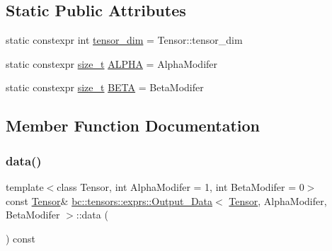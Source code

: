 \subsection*{Static Public Attributes}
\begin{DoxyCompactItemize}
\item 
static constexpr int \hyperlink{structbc_1_1tensors_1_1exprs_1_1Output__Data_a94a1df11454a60c39b2cefd6e22f4077}{tensor\+\_\+dim} = Tensor\+::tensor\+\_\+dim
\item 
static constexpr \hyperlink{namespacebc_aaf8e3fbf99b04b1b57c4f80c6f55d3c5}{size\+\_\+t} \hyperlink{structbc_1_1tensors_1_1exprs_1_1Output__Data_a8180bfc8cd47bd07e617da232baca625}{A\+L\+P\+HA} = Alpha\+Modifer
\item 
static constexpr \hyperlink{namespacebc_aaf8e3fbf99b04b1b57c4f80c6f55d3c5}{size\+\_\+t} \hyperlink{structbc_1_1tensors_1_1exprs_1_1Output__Data_a0de394d92d40090e01a31039ae473791}{B\+E\+TA} = Beta\+Modifer
\end{DoxyCompactItemize}


\subsection{Member Function Documentation}
\mbox{\label{structbc_1_1tensors_1_1exprs_1_1Output__Data_a78e4c65ec0092212f48fefa843f3e9bf}} 
\subsubsection{\texorpdfstring{data()}{data()}\hspace{0.1cm}{\footnotesize\ttfamily [1/2]}}
{\footnotesize\ttfamily template$<$class Tensor, int Alpha\+Modifer = 1, int Beta\+Modifer = 0$>$ \\
const \hyperlink{namespacebc_a659391e47ab612be3ba6c18cf9c89159}{Tensor}\& \hyperlink{structbc_1_1tensors_1_1exprs_1_1Output__Data}{bc\+::tensors\+::exprs\+::\+Output\+\_\+\+Data}$<$ \hyperlink{namespacebc_a659391e47ab612be3ba6c18cf9c89159}{Tensor}, Alpha\+Modifer, Beta\+Modifer $>$\+::data (\begin{DoxyParamCaption}{ }\end{DoxyParamCaption}) const\hspace{0.3cm}{\ttfamily [inline]}}

